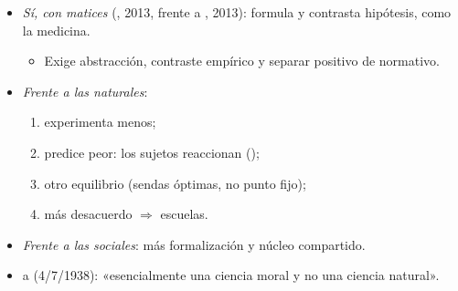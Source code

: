 \documentclass{article}
\begin{document}
\begin{columnas}
\begin{itemize}
\item \emph{Sí, con matices} (, 2013, frente a , 2013): formula y contrasta hipótesis, como la medicina.
  \begin{itemize}
  \item Exige abstracción, contraste empírico y separar positivo de normativo.
  \end{itemize}
\item \emph{Frente a las naturales}:
  \begin{enumerate}
  \item experimenta menos;
  \item predice peor: los sujetos reaccionan ();
  \item otro equilibrio (sendas óptimas, no punto fijo);
  \item más desacuerdo $\Rightarrow$ escuelas.
  \end{enumerate}
\item \emph{Frente a las sociales}: más formalización y núcleo compartido.
\item {} a  (4/7/1938): «esencialmente una ciencia moral y no una ciencia natural».
\end{itemize}


\end{columnas}
\end{document}
